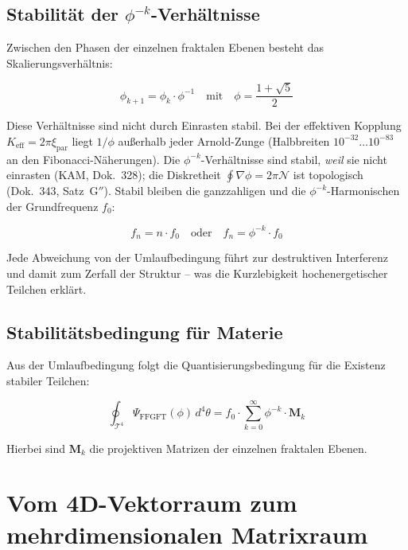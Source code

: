 	\subsection{Stabilität der $\phi^{-k}$-Verhältnisse}
	\label{sec:186_stabil}
	
	Zwischen den Phasen der einzelnen fraktalen Ebenen besteht das Skalierungsverhältnis:
	
	\begin{equation}
		\phi_{k+1} = \phi_k \cdot \phi^{-1} \quad \text{mit} \quad \phi = \frac{1+\sqrt{5}}{2}
	\end{equation}
	
	Diese Verhältnisse sind nicht durch Einrasten stabil. Bei der effektiven Kopplung $K_\mathrm{eff} = 2\pi\xi_{\text{par}}$ liegt $1/\phi$ außerhalb jeder Arnold-Zunge (Halbbreiten $10^{-32}\ldots10^{-83}$ an den Fibonacci-Näherungen). Die $\phi^{-k}$-Verhältnisse sind stabil, \emph{weil} sie nicht einrasten (KAM, Dok.~328); die Diskretheit $\oint\nabla\phi = 2\pi\mathcal{N}$ ist topologisch (Dok.~343, Satz~G$''$). Stabil bleiben die ganzzahligen und die $\phi^{-k}$-Harmonischen der Grundfrequenz $f_0$:
	
	\begin{equation}
		f_n = n \cdot f_0 \quad \text{oder} \quad f_n = \phi^{-k} \cdot f_0
	\end{equation}
	
	Jede Abweichung von der Umlaufbedingung führt zur destruktiven Interferenz und damit zum Zerfall der Struktur – was die Kurzlebigkeit hochenergetischer Teilchen erklärt.
	
	\subsection{Stabilitätsbedingung für Materie}
	
	Aus der Umlaufbedingung folgt die Quantisierungsbedingung für die Existenz stabiler Teilchen:
	
	\begin{equation}
		\oint_{\mathcal{T}^4} \Psi_{\text{FFGFT}}(\phi) \, d^4\theta = f_0 \cdot \sum_{k=0}^{\infty} \phi^{-k} \cdot \mathbf{M}_k
	\end{equation}
	
	Hierbei sind $\mathbf{M}_k$ die projektiven Matrizen der einzelnen fraktalen Ebenen.
	
	\section{Vom 4D-Vektorraum zum mehrdimensionalen Matrixraum}
	
